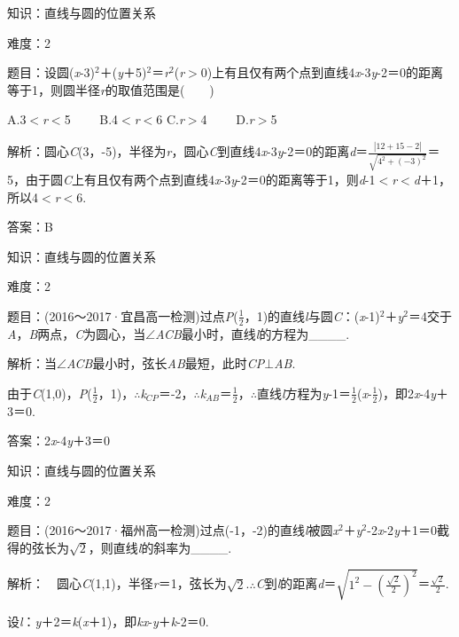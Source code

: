 \documentclass{article} %
\begin{document}
知识：直线与圆的位置关系

难度：2

题目：设圆(\textit{x}-3)${}^{2}$＋(\textit{y}＋5)${}^{2}$＝\textit{r}${}^{2}$(\textit{r}$\mathrm{>}$0)上有且仅有两个点到直线4\textit{x}-3\textit{y}-2＝0的距离等于1，则圆半径\textit{r}的取值范围是(　　)

A.3$\mathrm{<}$\textit{r}$\mathrm{<}$5　　 B.4$\mathrm{<}$\textit{r}$\mathrm{<}$6  
C.\textit{r}$\mathrm{>}$4　　 D.\textit{r}$\mathrm{>}$5

解析：圆心\textit{C}(3，-5)，半径为\textit{r}，圆心\textit{C}到直线4\textit{x}-3\textit{y}-2＝0的距离\textit{d}＝$\frac{|12+15-2|}{\sqrt{4^2+(-3)^2}}$＝5，由于圆\textit{C}上有且仅有两个点到直线4\textit{x}-3\textit{y}-2＝0的距离等于1，则\textit{d}-1$\mathrm{<}$\textit{r}$\mathrm{<}$\textit{d}＋1，所以4$\mathrm{<}$\textit{r}$\mathrm{<}$6.

答案：B

知识：直线与圆的位置关系

难度：2

题目：(2016～2017·宜昌高一检测)过点\textit{P}($\frac{1}{2}$，1)的直线\textit{l}与圆\textit{C}：(\textit{x}-1)${}^{2}$＋\textit{y}${}^{2}$＝4交于\textit{A}，\textit{B}两点，\textit{C}为圆心，当$\mathrm{\angle}$\textit{ACB}最小时，直线\textit{l}的方程为\_\_\_\_.

解析：当$\mathrm{\angle}$\textit{ACB}最小时，弦长\textit{AB}最短，此时\textit{CP}$\mathrm{\bot}$\textit{AB}.

由于\textit{C}(1,0)，\textit{P}($\frac{1}{2}$，1)，$\mathrm{\therefore}$\textit{k${}_{CP}$}＝-2，$\mathrm{\therefore}$\textit{k${}_{AB}$}＝$\frac{1}{2}$，$\mathrm{\therefore}$直线\textit{l}方程为\textit{y}-1＝$\frac{1}{2}$(\textit{x}-$\frac{1}{2}$)，即2\textit{x}-4\textit{y}＋3＝0.

答案：2\textit{x}-4\textit{y}＋3＝0

知识：直线与圆的位置关系

难度：2

题目：(2016～2017·福州高一检测)过点(-1，-2)的直线\textit{l}被圆\textit{x}${}^{2}$＋\textit{y}${}^{2}$-2\textit{x}-2\textit{y}＋1＝0截得的弦长为$\sqrt{2}$，则直线\textit{l}的斜率为\_\_\_\_.

解析：　圆心\textit{C}(1,1)，半径\textit{r}＝1，弦长为$\sqrt{2}$.$\mathrm{\therefore}$\textit{C}到\textit{l}的距离\textit{d}＝$\sqrt{1^2-(\frac{\sqrt{2}}{2})^2}$＝$\frac{\sqrt{2}}{2}$.

设\textit{l}：\textit{y}＋2＝\textit{k}(\textit{x}＋1)，即\textit{kx}-\textit{y}＋\textit{k}-2＝0.
\end{document}
